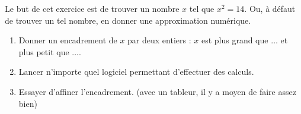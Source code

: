 
\begin{exercice}\label{exosmath-0901}

    Le but de cet exercice est de trouver un nombre \( x\) tel que \( x^2=14\). Ou, à défaut de trouver un tel nombre, en donner une approximation numérique.
    \begin{enumerate}
        \item
            Donner un encadrement de \( x\) par deux entiers : \( x\) est plus grand que \( \ldots\) et plus petit que \( \ldots\).
        \item
            Lancer n'importe quel logiciel permettant d'effectuer des calculs.
        \item
            Essayer d'affiner l'encadrement. (avec un tableur, il y a moyen de faire assez bien)
    \end{enumerate}

\end{exercice}
